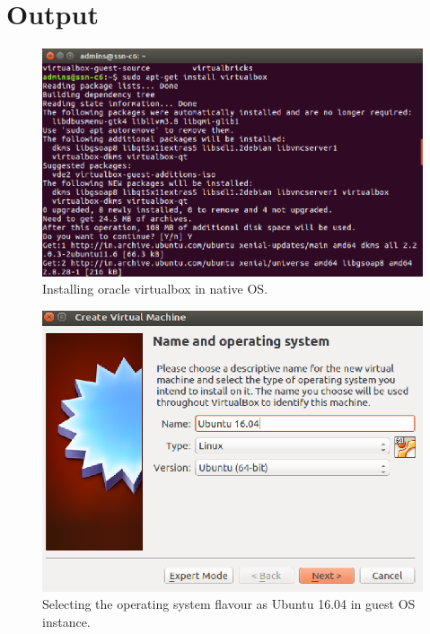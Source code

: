 \documentclass[a4paper,10pt]{article}
\begin{document}
\section{Output}

\begin{figure}[h]
	\includegraphics[scale=0.30,center]{fig1.png}
	\caption{Installing oracle virtualbox in native OS.}
	\label{fig:1}
	
\end{figure}

\begin{figure}[h]
	\includegraphics[scale=0.34,center]{fig2.png}
	\caption{Selecting the operating system flavour as Ubuntu 16.04 in guest OS instance.}
	\label{fig:2}
\end{figure}
\end{document}
